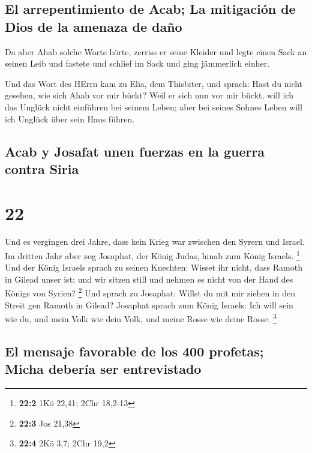 \hypertarget{el-arrepentimiento-de-acab-la-mitigaciuxf3n-de-dios-de-la-amenaza-de-dauxf1o}{%
\subsection{El arrepentimiento de Acab; La mitigación de Dios de la
amenaza de
daño}\label{el-arrepentimiento-de-acab-la-mitigaciuxf3n-de-dios-de-la-amenaza-de-dauxf1o}}

 Da aber Ahab solche Worte hörte, zerriss er seine
Kleider und legte einen Sack an seinen Leib und fastete und schlief im
Sack und ging jämmerlich einher.

 Und das Wort des HErrn kam zu Elia, dem Thisbiter, und
sprach:  Hast du nicht gesehen, wie sich Ahab vor mir
bückt? Weil er sich nun vor mir bückt, will ich das Unglück nicht
einführen bei seinem Leben; aber bei seines Sohnes Leben will ich
Unglück über sein Haus führen.

\hypertarget{acab-y-josafat-unen-fuerzas-en-la-guerra-contra-siria}{%
\subsection{Acab y Josafat unen fuerzas en la guerra contra
Siria}\label{acab-y-josafat-unen-fuerzas-en-la-guerra-contra-siria}}

\hypertarget{section-21}{%
\section{22}\label{section-21}}

 Und es vergingen drei Jahre, dass kein Krieg war zwischen
den Syrern und Israel.  Im dritten Jahr aber zog Josaphat,
der König Judas, hinab zum König Israels. \footnote{\textbf{22:2} 1Kö
  22,41; 2Chr 18,2-13}  Und der König Israels sprach zu
seinen Knechten: Wisset ihr nicht, dass Ramoth in Gilead unser ist; und
wir sitzen still und nehmen es nicht von der Hand des Königs von Syrien?
\footnote{\textbf{22:3} Jos 21,38}  Und sprach zu
Josaphat: Willst du mit mir ziehen in den Streit gen Ramoth in Gilead?
Josaphat sprach zum König Israels: Ich will sein wie du, und mein Volk
wie dein Volk, und meine Rosse wie deine Rosse. \footnote{\textbf{22:4}
  2Kö 3,7; 2Chr 19,2}

\hypertarget{el-mensaje-favorable-de-los-400-profetas-micha-deberuxeda-ser-entrevistado}{%
\subsection{El mensaje favorable de los 400 profetas; Micha debería ser
entrevistado}\label{el-mensaje-favorable-de-los-400-profetas-micha-deberuxeda-ser-entrevistado}}

